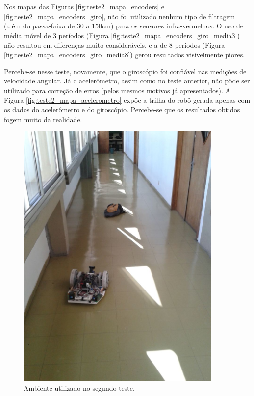 Nos mapas das Figuras \ref{fig:teste2_mapa_encoders} e \ref{fig:teste2_mapa_encoders_giro}, não foi utilizado nenhum tipo de filtragem (além do passa-faixa de 30 a 150cm) para os sensores infra-vermelhos. O uso de média móvel de 3 períodos (Figura \ref{fig:teste2_mapa_encoders_giro_media3}) não resultou em diferenças muito consideráveis, e a de 8 períodos (Figura \ref{fig:teste2_mapa_encoders_giro_media8}) gerou resultados visivelmente piores.

Percebe-se nesse teste, novamente, que o giroscópio foi confiável nas medições de velocidade angular. Já o acelerômetro, assim como no teste anterior, não pôde ser utilizado para correção de erros (pelos mesmos motivos já apresentados). A Figura \ref{fig:teste2_mapa_acelerometro} expôe a trilha do robô gerada apenas com os dados do acelerômetro e do giroscópio. Percebe-se que os resultados obtidos fogem muito da realidade.

\begin{figure}[H]
	\centering
	\includegraphics[width=0.9\textwidth]{./figuras/testes/teste2/foto_ambiente.jpg}
	\caption{Ambiente utilizado no segundo teste.}
	\label{fig:teste2_foto}
\end{figure}

